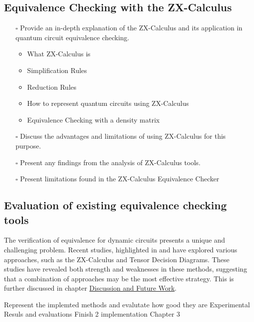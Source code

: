 \documentclass[11pt]{article}
\theoremstyle{definition}
\theoremstyle{definition}
\begin{document}
\subsection{Equivalence Checking with the ZX-Calculus}
\label{sec:orgaded60e}
\begin{itemize}
\item[{$\square$}] Provide an in-depth explanation of the ZX-Calculus and its application in quantum circuit equivalence checking.
\begin{itemize}
\item What ZX-Calculus is
\item Simplification Rules
\item Reduction Rules
\item How to represent quantum circuits using ZX-Calculus
\item Equivalence Checking with a density matrix
\end{itemize}
\item[{$\square$}] Discuss the advantages and limitations of using ZX-Calculus for this purpose.
\item[{$\square$}] Present any findings from the analysis of ZX-Calculus tools.
\item[{$\square$}] Present limitations found in the ZX-Calculus Equivalence Checker
\end{itemize}

\subsection{Evaluation of existing equivalence checking tools}
\label{sec:orgb66acd2}
The verification of equivalence for dynamic circuits presents a unique and challenging problem.
Recent studies, highlighted in
\cite{burgholzerHandlingNonunitariesQuantum2022} and
\cite{hongEquivalenceCheckingDynamic2021} have explored various
approaches, such as the ZX-Calculus and Tensor Decision Diagrams. These
studies have revealed both strength and weaknesses in these methods,
suggesting that a combination of approaches may be the most effective
strategy. This is further discussed in chapter \hyperref[sec:org4f581f6]{Discussion and Future Work}.

Represent the implemted methods and evalutate how good they are
Experimental Resuls and evaluations
Finish 2 
implementation
Chapter 3
\end{document}
